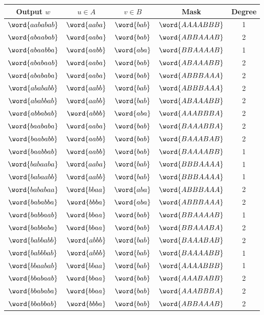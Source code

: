 \begin{center}
\small
\begin{tabular}{ccccc}
\toprule
Output $w$ & $u\in A$ & $v\in B$ & Mask & Degree\\
\midrule
$\word{aababab}$ & $\word{aaba}$ & $\word{bab}$ & $\word{AAAABBB}$ & 1\\
$\word{abaabab}$ & $\word{aaba}$ & $\word{bab}$ & $\word{ABBAAAB}$ & 2\\
$\word{abaabba}$ & $\word{aabb}$ & $\word{aba}$ & $\word{BBAAAAB}$ & 1\\
$\word{ababaab}$ & $\word{aaba}$ & $\word{bab}$ & $\word{ABAAABB}$ & 2\\
$\word{abababa}$ & $\word{aaba}$ & $\word{bab}$ & $\word{ABBBAAA}$ & 2\\
$\word{abababb}$ & $\word{aabb}$ & $\word{bab}$ & $\word{ABBBAAA}$ & 2\\
$\word{ababbab}$ & $\word{aabb}$ & $\word{bab}$ & $\word{ABAAABB}$ & 2\\
$\word{abbabab}$ & $\word{abbb}$ & $\word{aba}$ & $\word{AAABBBA}$ & 2\\
$\word{baababa}$ & $\word{aaba}$ & $\word{bab}$ & $\word{BAAABBA}$ & 2\\
$\word{baababb}$ & $\word{aabb}$ & $\word{bab}$ & $\word{BAAABAB}$ & 2\\
$\word{baabbab}$ & $\word{aabb}$ & $\word{bab}$ & $\word{BAAAABB}$ & 1\\
$\word{babaaba}$ & $\word{aaba}$ & $\word{bab}$ & $\word{BBBAAAA}$ & 1\\
$\word{babaabb}$ & $\word{aabb}$ & $\word{bab}$ & $\word{BBBAAAA}$ & 1\\
$\word{bababaa}$ & $\word{bbaa}$ & $\word{aba}$ & $\word{ABBBAAA}$ & 2\\
$\word{bababba}$ & $\word{bbba}$ & $\word{aba}$ & $\word{ABBBAAA}$ & 2\\
$\word{babbaab}$ & $\word{bbaa}$ & $\word{bab}$ & $\word{BBAAAAB}$ & 1\\
$\word{babbaba}$ & $\word{bbaa}$ & $\word{bab}$ & $\word{BBAAABA}$ & 2\\
$\word{babbabb}$ & $\word{abbb}$ & $\word{bab}$ & $\word{BAAABAB}$ & 2\\
$\word{babbbab}$ & $\word{abbb}$ & $\word{bab}$ & $\word{BAAAABB}$ & 1\\
$\word{bbaabab}$ & $\word{bbaa}$ & $\word{bab}$ & $\word{AAAABBB}$ & 1\\
$\word{bbabaab}$ & $\word{bbaa}$ & $\word{bab}$ & $\word{AAABABB}$ & 2\\
$\word{bbababa}$ & $\word{bbaa}$ & $\word{bab}$ & $\word{AAABBBA}$ & 2\\
$\word{bbabbab}$ & $\word{bbba}$ & $\word{bab}$ & $\word{ABBAAAB}$ & 2\\
\bottomrule
\end{tabular}
\end{center}

